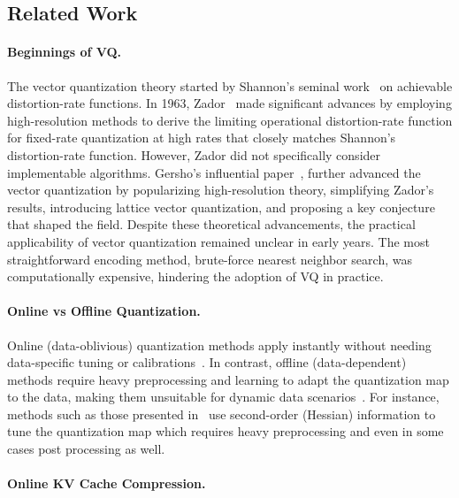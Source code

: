 \documentclass[11pt]{article}
\begin{document}
\subsection{Related Work}

\paragraph{Beginnings of VQ.}
The vector quantization theory started by Shannon's seminal work~\cite{shannon1948mathematical, shannon1959coding} on achievable distortion-rate functions. 
In 1963, Zador~\cite{zador1964development} made significant advances by employing high-resolution methods to derive the limiting operational distortion-rate function for fixed-rate quantization at high rates that closely matches Shannon's distortion-rate function. 
However, Zador did not specifically consider implementable algorithms. 
Gersho's influential paper~\cite{gersho1979asymptotically}, further advanced the vector quantization by popularizing high-resolution theory, simplifying Zador's results, introducing lattice vector quantization, and proposing a key conjecture that shaped the field.
Despite these theoretical advancements, the practical applicability of vector quantization remained unclear in early years. 
The most straightforward encoding method, brute-force nearest neighbor search, was computationally expensive, hindering the adoption of VQ in practice.

\paragraph{Online vs Offline Quantization.}
Online (data-oblivious) quantization methods apply instantly without needing data-specific tuning or calibrations~\cite{dettmers2022gpt3, ashkboos2024quarot, liu2024kivi, shah2024flashattention, han2025polarquant}. 
In contrast, offline (data-dependent) methods require heavy preprocessing and learning to adapt the quantization map to the data, making them unsuitable for dynamic data scenarios~\cite{kim2023squeezellm}.
For instance, methods such as those presented in~\cite{frantar2022gptq, lin2024awq, xiao2023smoothquant, chee2023quip} use second-order (Hessian) information to tune the quantization map which requires heavy preprocessing and even in some cases post processing as well.


\paragraph{Online KV Cache Compression.}
\end{document}
